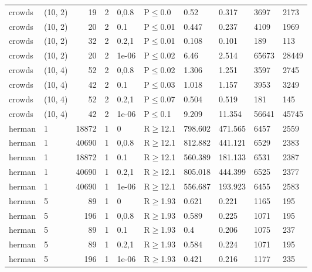 \begin{longtable}{llrrllllll}
 crowds        & (10, 2)  &     	19 &   2 & 0,0.8 & P$\leq$0.0   & 0.52     & 0.317   & 3697    & 2173    \\
 crowds        & (10, 2)  &     	20 &   2 & 0.1   & P$\leq$0.01  & 0.447    & 0.237   & 4109    & 1969    \\
 crowds        & (10, 2)  &     	32 &   2 & 0.2,1 & P$\leq$0.01  & 0.108    & 0.101   & 189     & 113     \\
 crowds        & (10, 2)  &     	20 &   2 & 1e-06 & P$\leq$0.02  & 6.46     & 2.514   & 65673   & 28449   \\
 crowds        & (10, 4)  &     	52 &   2 & 0,0.8 & P$\leq$0.02  & 1.306    & 1.251   & 3597    & 2745    \\
 crowds        & (10, 4)  &     	42 &   2 & 0.1   & P$\leq$0.03  & 1.018    & 1.157   & 3953    & 3249    \\
 crowds        & (10, 4)  &     	52 &   2 & 0.2,1 & P$\leq$0.07  & 0.504    & 0.519   & 181     & 145     \\
 crowds        & (10, 4)  &     	42 &   2 & 1e-06 & P$\leq$0.1   & 9.209    & 11.354  & 56641   & 45745   \\
 herman        & 1        &  	18872 &   1 & 0     & R$\geq$12.1  & 798.602  & 471.565 & 6457    & 2559    \\
 herman        & 1        &  	40690 &   1 & 0,0.8 & R$\geq$12.1  & 812.882  & 441.121 & 6529    & 2383    \\
 herman        & 1        &  	18872 &   1 & 0.1   & R$\geq$12.1  & 560.389  & 181.133 & 6531    & 2387    \\
 herman        & 1        &  	40690 &   1 & 0.2,1 & R$\geq$12.1  & 805.018  & 444.399 & 6525    & 2377    \\
 herman        & 1        &  	40690 &   1 & 1e-06 & R$\geq$12.1  & 556.687  & 193.923 & 6455    & 2583    \\
 herman        & 5        &     	89 &   1 & 0     & R$\geq$1.93  & 0.621    & 0.221   & 1165    & 195     \\
 herman        & 5        &    	196 &   1 & 0,0.8 & R$\geq$1.93  & 0.589    & 0.225   & 1071    & 195     \\
 herman        & 5        &     	89 &   1 & 0.1   & R$\geq$1.93  & 0.4      & 0.206   & 1075    & 237     \\
 herman        & 5        &     	89 &   1 & 0.2,1 & R$\geq$1.93  & 0.584    & 0.224   & 1071    & 195     \\
 herman        & 5        &    	196 &   1 & 1e-06 & R$\geq$1.93  & 0.421    & 0.216   & 1177    & 235     \\

\end{longtable}
